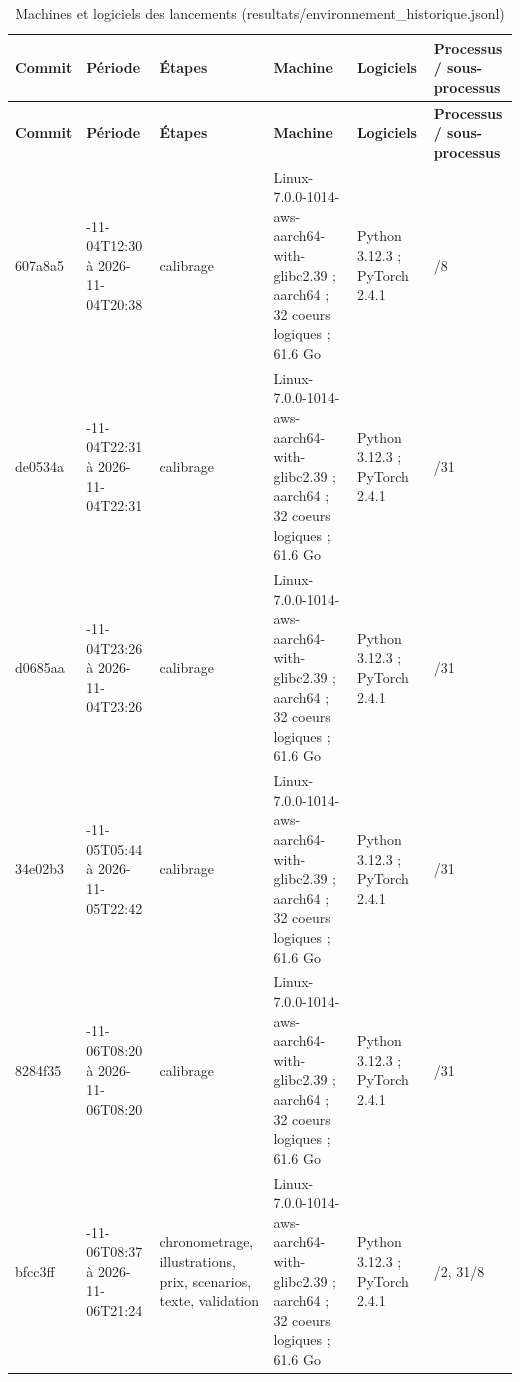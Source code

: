 {\tiny
\setlength{\tabcolsep}{3pt}
\begin{longtable}{>{\raggedright\arraybackslash}p{1.30cm}>{\raggedright\arraybackslash}p{2.40cm}>{\raggedright\arraybackslash}p{3.00cm}>{\raggedright\arraybackslash}p{4.20cm}>{\raggedright\arraybackslash}p{2.40cm}>{\raggedright\arraybackslash}p{2.00cm}}
\caption{Machines et logiciels des lancements (resultats/environnement\_historique.jsonl)}\label{tab:environnement}\\
\toprule
\textbf{Commit} & \textbf{Période} & \textbf{Étapes} & \textbf{Machine} & \textbf{Logiciels} & \textbf{Processus / sous-processus} \\
\midrule
\endfirsthead
\toprule
\textbf{Commit} & \textbf{Période} & \textbf{Étapes} & \textbf{Machine} & \textbf{Logiciels} & \textbf{Processus / sous-processus} \\
\midrule
\endhead
\bottomrule
\endfoot
607a8a5 & 2026-11-04T12:30 à 2026-11-04T20:38 & calibrage & Linux-7.0.0-1014-aws-aarch64-with-glibc2.39 ; aarch64 ; 32 coeurs logiques ; 61.6 Go & Python 3.12.3 ; PyTorch 2.4.1 & 31/8 \\
de0534a & 2026-11-04T22:31 à 2026-11-04T22:31 & calibrage & Linux-7.0.0-1014-aws-aarch64-with-glibc2.39 ; aarch64 ; 32 coeurs logiques ; 61.6 Go & Python 3.12.3 ; PyTorch 2.4.1 & 31/31 \\
d0685aa & 2026-11-04T23:26 à 2026-11-04T23:26 & calibrage & Linux-7.0.0-1014-aws-aarch64-with-glibc2.39 ; aarch64 ; 32 coeurs logiques ; 61.6 Go & Python 3.12.3 ; PyTorch 2.4.1 & 31/31 \\
34e02b3 & 2026-11-05T05:44 à 2026-11-05T22:42 & calibrage & Linux-7.0.0-1014-aws-aarch64-with-glibc2.39 ; aarch64 ; 32 coeurs logiques ; 61.6 Go & Python 3.12.3 ; PyTorch 2.4.1 & 31/31 \\
8284f35 & 2026-11-06T08:20 à 2026-11-06T08:20 & calibrage & Linux-7.0.0-1014-aws-aarch64-with-glibc2.39 ; aarch64 ; 32 coeurs logiques ; 61.6 Go & Python 3.12.3 ; PyTorch 2.4.1 & 31/31 \\
bfcc3ff & 2026-11-06T08:37 à 2026-11-06T21:24 & chronometrage, illustrations, prix, scenarios, texte, validation & Linux-7.0.0-1014-aws-aarch64-with-glibc2.39 ; aarch64 ; 32 coeurs logiques ; 61.6 Go & Python 3.12.3 ; PyTorch 2.4.1 & 31/2, 31/8 \\
\end{longtable}
}
